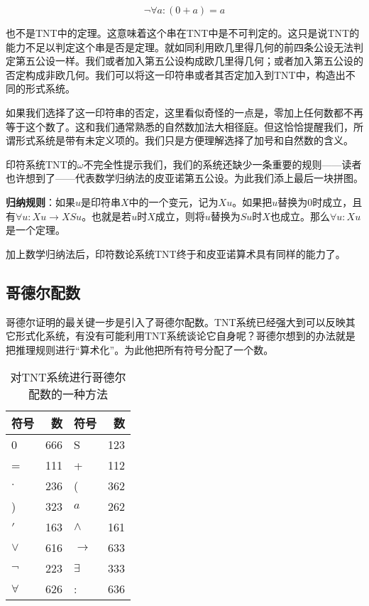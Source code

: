 \documentclass{article}
\begin{document}
\[
\lnot \forall a: (0 + a) = a
\]

也不是TNT中的定理。这意味着这个串在TNT中是不可判定的。这只是说TNT的能力不足以判定这个串是否是定理。就如同利用欧几里得几何的前四条公设无法判定第五公设一样。我们或者加入第五公设构成欧几里得几何；或者加入第五公设的否定构成非欧几何。我们可以将这一印符串或者其否定加入到TNT中，构造出不同的形式系统。

如果我们选择了这一印符串的否定，这里看似奇怪的一点是，零加上任何数都不再等于这个数了。这和我们通常熟悉的自然数加法大相径庭。但这恰恰提醒我们，所谓形式系统是带有未定义项的。我们只是方便理解选择了加号和自然数的含义。

印符系统TNT的$\omega$不完全性提示我们，我们的系统还缺少一条重要的规则——读者也许想到了——代表数学归纳法的皮亚诺第五公设。为此我们添上最后一块拼图。

\textbf{归纳规则}：如果$u$是印符串$X$中的一个变元，记为$X{u}$。如果把$u$替换为0时成立，且有$\forall u: X{u} \to X{Su}$。也就是若$u$时$X$成立，则将$u$替换为$Su$时$X$也成立。那么$\forall u: X{u}$是一个定理。

加上数学归纳法后，印符数论系统TNT终于和皮亚诺算术具有同样的能力了。

\begin{Exercise}
\end{Exercise}

\subsection{哥德尔配数}
哥德尔证明的最关键一步是引入了哥德尔配数。TNT系统已经强大到可以反映其它形式化系统，有没有可能利用TNT系统谈论它自身呢？哥德尔想到的办法就是把推理规则进行“算术化”。为此他把所有符号分配了一个数。

\begin{table}[htbp]
\centering
\begin{tabular}{|l|r||l|r|}
\hline
\textbf{符号} & \textbf{数} & \textbf{符号} & \textbf{数} \\
\hline
0 & 666 & S & 123 \\
\hline
= & 111 & + & 112 \\
\hline
$\cdot$ & 236 & ( & 362 \\
\hline
) & 323 & $a$ & 262 \\
\hline
$'$ & 163 & $\land$ & 161 \\
\hline
$\lor$ & 616 & $\to$ & 633 \\
\hline
$\lnot$ & 223 & $\exists$ & 333 \\
\hline
$\forall$ & 626 & : & 636 \\
\hline
\end{tabular}
\caption{对TNT系统进行哥德尔配数的一种方法}
\end{table}
\end{document}
